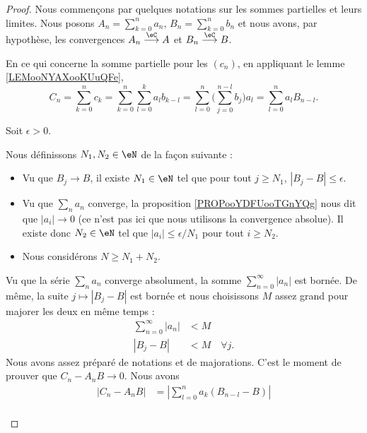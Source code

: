 \begin{proof}
	Nous commençons par quelques notations sur les sommes partielles et leurs limites. Nous posons \( A_n=\sum_{k=0}^na_n\), \( B_n=\sum_{k=0}^nb_n\) et nous avons, par hypothèse, les convergences \( A_n\stackrel{\eC}{\longrightarrow}A\) et \( B_n\stackrel{\eC}{\longrightarrow}B\).

	En ce qui concerne la somme partielle pour les \( (c_n)\), en appliquant le lemme \ref{LEMooNYAXooKUuQFe},
	\begin{equation}
		C_n=\sum_{k=0}^nc_k=\sum_{k=0}^n\sum_{l=0}^ka_lb_{k-l}=\sum_{l=0}^n\big( \sum_{j=0}^{n-l}b_j \big)a_l=\sum_{l=0}^na_lB_{n-l}.
	\end{equation}

	Soit \( \epsilon>0\).
	\begin{subproof}
		Nous définissons \( N_1, N_2\in \eN\) de la façon suivante :
		\begin{itemize}
			\item
			      Vu que \( B_j\to B\), il existe \( N_1\in \eN\) tel que pour tout \( j\geq N_1\), \( | B_j-B |\leq \epsilon\).
			\item
			      Vu que \( \sum_na_n\) converge, la proposition \ref{PROPooYDFUooTGnYQg} nous dit que \( | a_i |\to 0\) (ce n'est pas ici que nous utilisons la convergence absolue). Il existe donc \( N_2\in \eN\) tel que \( | a_i |\leq \epsilon/N_1\) pour tout \( i\geq N_2\).
			\item
			      Nous considérons \( N\geq N_1+N_2\).
		\end{itemize}
		\spitem[Un majorant]
		Vu que la série \( \sum_na_n\) converge absolument, la somme \( \sum_{n=0}^{\infty}| a_n |\) est bornée. De même, la suite \( j\mapsto| B_j-B |\) est bornée et nous choisissons \( M\) assez grand pour majorer les deux en même temps :
		\begin{subequations}
			\begin{align}
				\sum_{n=0}^{\infty}| a_n | & <M           \label{SUBEQooBKCVooXnampA} \\
				| B_j-B |                  & <M\quad \forall j.
			\end{align}
		\end{subequations}
		Nous avons assez préparé de notations et de majorations. C'est le moment de prouver que \( C_n-A_nB \to 0\). Nous avons
		\begin{subequations}
			\begin{align}
				| C_n-A_nB | & =| \sum_{l=0}^na_k(B_{n-l}-B) |                                                                    \\

\end{align}
\end{subequations}
\end{subproof}
\end{proof}

